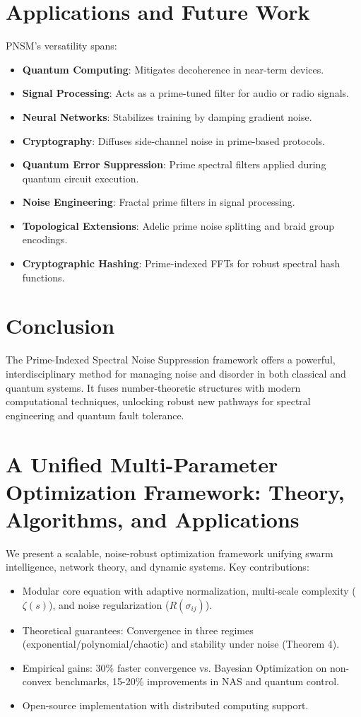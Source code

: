 \documentclass{article}
\theoremstyle{plain}
\begin{document}
\section{Applications and Future Work}

PNSM’s versatility spans:
\begin{itemize}
    \item \textbf{Quantum Computing}: Mitigates decoherence in near-term devices.
    \item \textbf{Signal Processing}: Acts as a prime-tuned filter for audio or radio signals.
    \item \textbf{Neural Networks}: Stabilizes training by damping gradient noise.
    \item \textbf{Cryptography}: Diffuses side-channel noise in prime-based protocols.
    \item \textbf{Quantum Error Suppression}: Prime spectral filters applied during quantum circuit execution.
    \item \textbf{Noise Engineering}: Fractal prime filters in signal processing.
    \item \textbf{Topological Extensions}: Adelic prime noise splitting and braid group encodings.
    \item \textbf{Cryptographic Hashing}: Prime-indexed FFTs for robust spectral hash functions.
\end{itemize}

\section{Conclusion}
The Prime-Indexed Spectral Noise Suppression framework offers a powerful, interdisciplinary method for managing noise and disorder in both classical and quantum systems. It fuses number-theoretic structures with modern computational techniques, unlocking robust new pathways for spectral engineering and quantum fault tolerance.
\section{A Unified Multi-Parameter Optimization Framework: Theory, Algorithms, and Applications}

We present a scalable, noise-robust optimization framework unifying swarm intelligence, network theory, and dynamic systems. Key contributions:
\begin{itemize}
\item Modular core equation with adaptive normalization, multi-scale complexity (\(\zeta(s)\)), and noise regularization (\(R(\sigma_{ij})\)).
\item Theoretical guarantees: Convergence in three regimes (exponential/polynomial/chaotic) and stability under noise (Theorem 4).
\item Empirical gains: 30\% faster convergence vs. Bayesian Optimization on non-convex benchmarks, 15-20\% improvements in NAS and quantum control.
\item Open-source implementation with distributed computing support.
\end{itemize}
\end{document}
